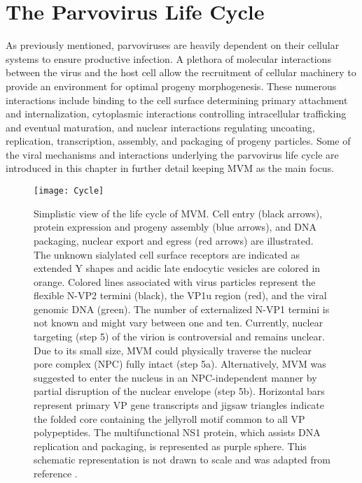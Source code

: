 
\chapter{The Parvovirus Life Cycle} %

\label{Chapter7} %


As previously mentioned, parvoviruses are heavily dependent on their cellular systems to ensure productive infection. A plethora of molecular interactions between the virus and the host cell allow the recruitment of cellular machinery to provide an environment for optimal progeny morphogenesis. These numerous interactions include binding to the cell surface determining primary attachment and internalization, cytoplasmic interactions controlling intracellular trafficking and eventual maturation, and nuclear interactions regulating uncoating, replication, transcription, assembly, and packaging of progeny particles. Some of the viral mechanisms and interactions underlying the parvovirus life cycle are introduced in this chapter in further detail keeping MVM as the main focus.     


\begin{figure}[H]
\centering
  \texttt{[image: Cycle]}
  \caption[Life cycle of MVM]
   {Simplistic view of the life cycle of MVM. Cell entry (black arrows), protein expression and progeny assembly (blue arrows), and DNA packaging, nuclear export and egress (red arrows) are illustrated. The unknown sialylated cell surface receptors are indicated as extended Y shapes and acidic late endocytic vesicles are colored in orange. Colored lines associated with virus particles represent the flexible N-VP2 termini (black), the VP1u region (red), and the viral genomic DNA (green). The number of externalized N-VP1 termini is not known and might vary between one and ten. Currently, nuclear targeting (step 5) of the virion is controversial and remains unclear. Due to its small size, MVM could physically traverse the nuclear pore complex (NPC) fully intact (step 5a). Alternatively, MVM was suggested to enter the nucleus in an NPC-independent manner by partial disruption of the nuclear envelope (step 5b). Horizontal bars represent primary VP gene transcripts and jigsaw triangles indicate the folded core containing the jellyroll motif common to all VP polypeptides. The multifunctional NS1 protein, which assists DNA replication and packaging, is represented as purple sphere. This schematic representation is not drawn to scale and was adapted from reference \cite{small}.  
} 
\label{Cycle}
\end{figure}


